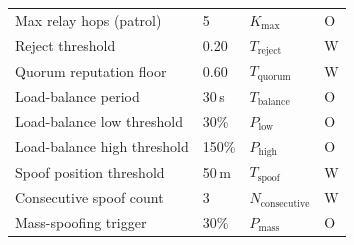 \documentclass[conference,10pt]{IEEEtran}
\begin{document}
\begin{table}[t]
{\begin{tabular}{llll}
Max relay hops (patrol) & 5 & $K_\text{max}$ & O \\
Reject threshold & 0.20 & $T_\text{reject}$ & W \\
Quorum reputation floor & 0.60 & $T_\text{quorum}$ & W \\
Load-balance period & 30\,s & $T_\text{balance}$ & O \\
Load-balance low threshold & 30\% & $P_\text{low}$ & O \\
Load-balance high threshold & 150\% & $P_\text{high}$ & O \\
Spoof position threshold & 50\,m & $T_\text{spoof}$ & W \\
Consecutive spoof count & 3 & $N_\text{consecutive}$ & W \\
Mass-spoofing trigger & 30\% & $P_\text{mass}$ & O \\
\bottomrule
\end{tabular}%
}
\end{table}
\end{document}
